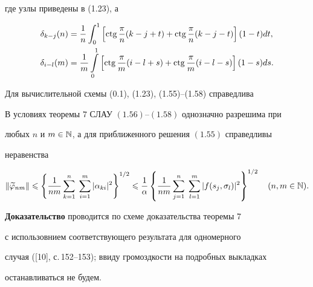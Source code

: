 где узлы приведены в (1.23), а


\begin{align}


\delta_{k-j}(n) &= \frac{1}{n}\int_0^1\left[\ctg


\frac{\pi}{n}(k-j+t)+\ctg \frac{\pi}{n}(k-j-t)\right](1-t)dt, \\


%


\delta_{i-l}(m) &= \frac{1}{m}\intl_0^1\left[


\ctg \frac{\pi}{m}(i-l+s)+\ctg\frac{\pi}{m}(i-l-s)\right](1-s)ds.


\end{align}





Для вычислительной схемы (0.1), (1.23), (1.55)--(1.58) справедлива 





\begin{thm}


В условиях теоремы $7$ СЛАУ $(1.56)$--$(1.58)$ однозначно разрешима при 


любых $n$ и $m \in \Bbb N$, а для приближенного решения $(1.55)$ справедливы 


неравенства


$$


\|\widetilde{\vp}_{nm}\|\lea \left\{


\frac{1}{nm}\sum_{k=1}^n\;\sum_{i=1}^m|\alpha_{ki}|^2\right\}^{1/2}\lea 


\frac{1}{\alpha}\left\{


\frac{1}{nm}\sum_{j=1}^n\;\sum_{l=1}^m|f(s_j,\sigma_l)|^2\right\}^{1/2}


\quad (n,m\in \N).


$$


\end{thm}





{\bf Доказательство} проводится по схеме доказательства теоремы 7


с использовнием соответствующего результата для одномерного 


случая ([10], с.\,152--153); ввиду громоздкости на подробных выкладках 


останавливаться не будем.








